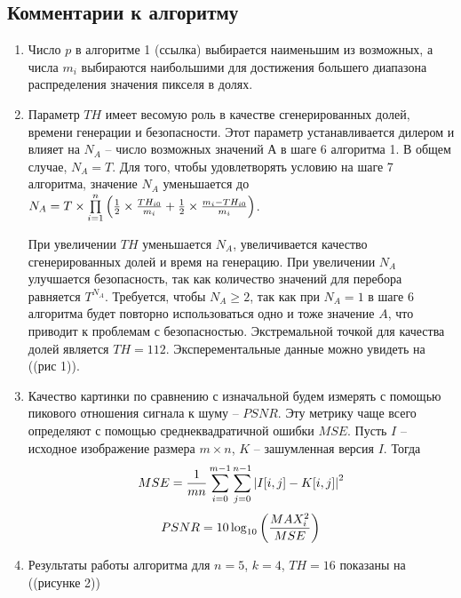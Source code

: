 \documentclass[a4paper,article,14pt]{extarticle}
\begin{document}
\subsection{Комментарии к алгоритму}
\begin{enumerate}
    \item Число $p$ в алгоритме 1 (ссылка) выбирается наименьшим из возможных, а числа $m_i$ выбираются наибольшими для достижения 
    большего диапазона распределения значения пикселя в долях.

    \item Параметр $TH$ имеет весомую роль в качестве сгенерированных долей, времени генерации и безопасности. Этот параметр устанавливается 
    дилером и влияет на $N_A$ -- число возможных значений А в шаге 6 алгоритма 1.
    В общем случае, $N_A = T$. Для того, чтобы удовлетворять условию на шаге 7 алгоритма, значение $N_A$ уменьшается до 
    $N_A = T \times \prod\limits_{i = 1}^n \left({1\over 2} \times {TH_{i0}\over m_i} + {1\over 2} \times {{m_i - TH_{i0}}\over m_i}\right)$.
    
    При увеличении $TH$ уменьшается $N_A$, увеличивается качество сгенерированных долей и время на генерацию.
    При увеличении $N_A$ улучшается безопасность, так как количество значений для перебора равняется $T^{N_A}$. 
    Требуется, чтобы $N_A \geq 2$, так как при $N_A = 1$ в шаге 6 алгоритма будет 
    повторно использоваться одно и тоже значение $A$, что приводит к проблемам с безопасностью. Экстремальной точкой для качества долей 
    является $TH = 112$. Эксперементальные данные можно увидеть на ((рис 1)). 

    \item Качество картинки по сравнению с изначальной будем измерять с помощью пикового отношения сигнала к шуму -- $PSNR$. Эту метрику чаще всего 
    определяют с помощью среднеквадратичной ошибки $MSE$. Пусть $I$ -- исходное изображение размера $m \times n$, $K$ -- зашумленная версия $I$. Тогда 
    \begin{equation}
        MSE = {1\over mn} \sum_{i=0}^{m-1} \sum_{j=0}^{n-1}{|I[i, j] - K[i, j]|}^2
    \end{equation}
    \begin{equation}
        PSNR = 10 \log_{10}\left({{MAX_i^2} \over {MSE}} \right)
    \end{equation}

    \item Результаты работы алгоритма для $n=5$, $k=4$, $TH=16$ показаны на ((рисунке 2)) 
\end{enumerate}
\end{document}
